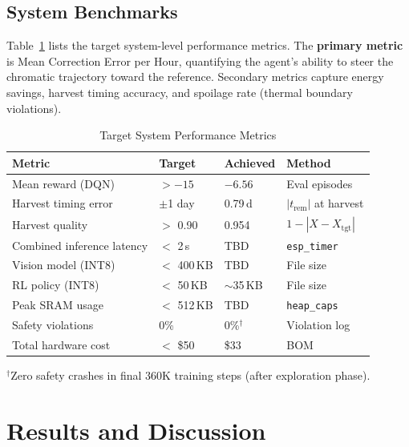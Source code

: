 \documentclass[conference]{IEEEtran}
\begin{document}
    \subsection{System Benchmarks}

    Table~\ref{tab:benchmarks} lists the target system-level performance metrics.  The \textbf{primary metric} is Mean Correction Error per Hour, quantifying the agent's ability to steer the chromatic trajectory toward the reference.  Secondary metrics capture energy savings, harvest timing accuracy, and spoilage rate (thermal boundary violations).

    \begin{table}[htbp]
    \caption{Target System Performance Metrics}
    \label{tab:benchmarks}
    \centering
    \begin{tabular}{@{}lp{1.8cm}p{1.5cm}l@{}}
    \toprule
    \textbf{Metric} & \textbf{Target} & \textbf{Achieved} & \textbf{Method} \\
    \midrule
    Mean reward (DQN) & $> -15$ & $-6.56$ & Eval episodes \\
    Harvest timing error & $\pm$1 day & 0.79\,d & $|t_{\text{rem}}|$ at harvest \\
    Harvest quality & $>$ 0.90 & 0.954 & $1 - |X - X_{\text{tgt}}|$ \\
    Combined inference latency & $<$ 2\,s & TBD & \texttt{esp\_timer} \\
    Vision model (INT8) & $<$ 400\,KB & TBD & File size \\
    RL policy (INT8) & $<$ 50\,KB & $\sim$35\,KB & File size \\
    Peak SRAM usage & $<$ 512\,KB & TBD & \texttt{heap\_caps} \\
    Safety violations & 0\% & 0\%$^\dagger$ & Violation log \\
    Total hardware cost & $<$ \$50 & \$33 & BOM \\
    \bottomrule
    \end{tabular}
    \vspace{2pt}
    \newline
    {\scriptsize $^\dagger$Zero safety crashes in final 360K training steps (after exploration phase).}
    \end{table}

    \FloatBarrier
    \section{Results and Discussion}
    \label{sec:results}
\end{document}
